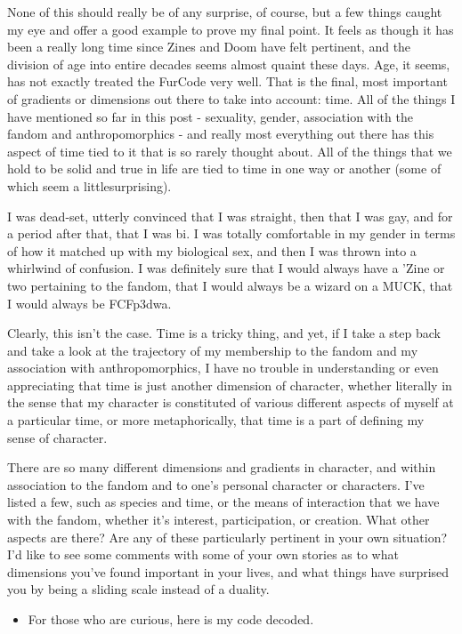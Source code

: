 None of this should really be of any surprise, of course, but a few things caught my eye and offer a good example to prove my final point. It feels as though it has been a really long time since Zines and Doom have felt pertinent, and the division of age into entire decades seems almost quaint these days. Age, it seems, has not exactly treated the FurCode very well. That is the final, most important of gradients or dimensions out there to take into account: time. All of the things I have mentioned so far in this post - sexuality, gender, association with the fandom and anthropomorphics - and really most everything out there has this aspect of time tied to it that is so rarely thought about. All of the things that we hold to be solid and true in life are tied to time in one way or another (some of which seem a littlesurprising).

I was dead-set, utterly convinced that I was straight, then that I was gay, and for a period after that, that I was bi. I was totally comfortable in my gender in terms of how it matched up with my biological sex, and then I was thrown into a whirlwind of confusion. I was definitely sure that I would always have a 'Zine or two pertaining to the fandom, that I would always be a wizard on a MUCK, that I would always be FCFp3dwa.

Clearly, this isn't the case. Time is a tricky thing, and yet, if I take a step back and take a look at the trajectory of my membership to the fandom and my association with anthropomorphics, I have no trouble in understanding or even appreciating that time is just another dimension of character, whether literally in the sense that my character is constituted of various different aspects of myself at a particular time, or more metaphorically, that time is a part of defining my sense of character.

There are so many different dimensions and gradients in character, and within association to the fandom and to one's personal character or characters. I've listed a few, such as species and time, or the means of interaction that we have with the fandom, whether it's interest, participation, or creation. What other aspects are there? Are any of these particularly pertinent in your own situation? I'd like to see some comments with some of your own stories as to what dimensions you've found important in your lives, and what things have surprised you by being a sliding scale instead of a duality.

\begin{itemize}
\tightlist
\item
  For those who are curious, here is my code decoded.
\end{itemize}
